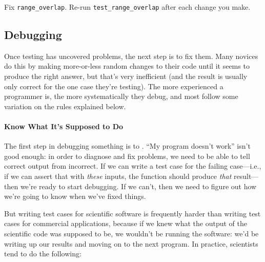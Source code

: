\documentclass{book}
\begin{document}
\begin{challenge}
  Fix \texttt{range\_overlap}. Re-run \texttt{test\_range\_overlap}
  after each change you make.
\end{challenge}

\subsection{Debugging}

Once testing has uncovered problems, the next step is to fix them. Many
novices do this by making more-or-less random changes to their code
until it seems to produce the right answer, but that's very inefficient
(and the result is usually only correct for the one case they're
testing). The more experienced a programmer is, the more systematically
they debug, and most follow some variation on the rules explained below.

\mbox{}\paragraph{Know What It's Supposed to Do}

The first step in debugging something is to
. ``My program doesn't work'' isn't good enough: in order
to diagnose and fix problems, we need to be able to tell correct output
from incorrect. If we can write a test case for the failing case---i.e.,
if we can assert that with \emph{these} inputs, the function should
produce \emph{that} result--- then we're ready to start debugging. If we
can't, then we need to figure out how we're going to know when we've
fixed things.

But writing test cases for scientific software is frequently harder than
writing test cases for commercial applications, because if we knew what
the output of the scientific code was supposed to be, we wouldn't be
running the software: we'd be writing up our results and moving on to
the next program. In practice, scientists tend to do the following:
\end{document}
